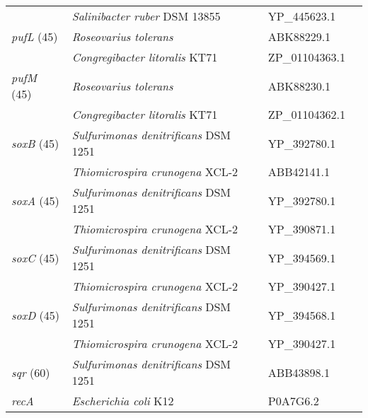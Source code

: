 \begin{table}
\begin{tabularx}{\textwidth}{p{1.6cm}Xp{1.8cm}p{3.5cm}}
 & \emph{Salinibacter ruber} DSM 13855 & YP\_445623.1 & \citet{Balashov2005}\\
\emph{pufL} (45) & \emph{Roseovarius tolerans} & ABK88229.1 & \citet{Labrenz1999}\\
 & \emph{Congregibacter litoralis} KT71 & ZP\_01104363.1 & \citet{Fuchs2006}\\
\emph{pufM} (45) & \emph{Roseovarius tolerans} & ABK88230.1 & \citet{Labrenz1999}\\
 & \emph{Congregibacter litoralis} KT71 & ZP\_01104362.1 & \citet{Fuchs2006}\\
\emph{soxB} (45) & \emph{Sulfurimonas denitrificans} DSM 1251 & YP\_392780.1 & \citet{Sievert2008}\\
 & \emph{Thiomicrospira crunogena} XCL-2 & ABB42141.1 & \citet{Scott2006}\\
\emph{soxA} (45) & \emph{Sulfurimonas denitrificans} DSM 1251 & YP\_392780.1 & \citet{Sievert2008}\\
 & \emph{Thiomicrospira crunogena} XCL-2 & YP\_390871.1 & \citet{Scott2006}\\
\emph{soxC} (45) & \emph{Sulfurimonas denitrificans} DSM 1251 & YP\_394569.1 & \citet{Sievert2008}\\
 & \emph{Thiomicrospira crunogena} XCL-2 & YP\_390427.1 & \citet{Scott2006}\\
\emph{soxD} (45) & \emph{Sulfurimonas denitrificans} DSM 1251 & YP\_394568.1 & \citet{Sievert2008}\\
 & \emph{Thiomicrospira crunogena} XCL-2 & YP\_390427.1 & \citet{Scott2006}\\
\emph{sqr} (60)  & \emph{Sulfurimonas denitrificans} DSM 1251 & ABB43898.1 & \citet{Sievert2008}\\
\emph{recA} & \emph{Escherichia coli} K12 & P0A7G6.2 & \citet{Howard2008}\\
\bottomrule
\end{tabularx}
\end{table}
